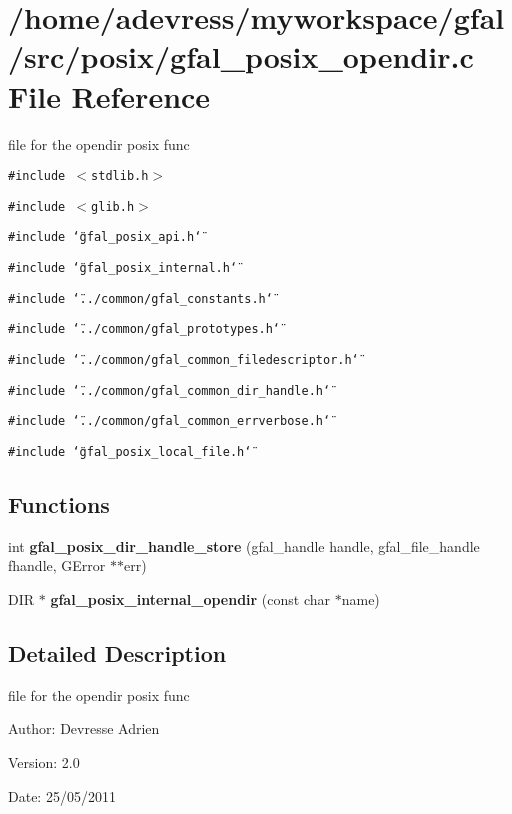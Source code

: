 \section{/home/adevress/myworkspace/gfal/src/posix/gfal\_\-posix\_\-opendir.c File Reference}
\label{gfal__posix__opendir_8c}
file for the opendir posix func 

{\tt \#include $<$stdlib.h$>$}\par
{\tt \#include $<$glib.h$>$}\par
{\tt \#include \char`\"{}gfal\_\-posix\_\-api.h\char`\"{}}\par
{\tt \#include \char`\"{}gfal\_\-posix\_\-internal.h\char`\"{}}\par
{\tt \#include \char`\"{}../common/gfal\_\-constants.h\char`\"{}}\par
{\tt \#include \char`\"{}../common/gfal\_\-prototypes.h\char`\"{}}\par
{\tt \#include \char`\"{}../common/gfal\_\-common\_\-filedescriptor.h\char`\"{}}\par
{\tt \#include \char`\"{}../common/gfal\_\-common\_\-dir\_\-handle.h\char`\"{}}\par
{\tt \#include \char`\"{}../common/gfal\_\-common\_\-errverbose.h\char`\"{}}\par
{\tt \#include \char`\"{}gfal\_\-posix\_\-local\_\-file.h\char`\"{}}\par
\subsection*{Functions}
\begin{CompactItemize}
\item 
int \textbf{gfal\_\-posix\_\-dir\_\-handle\_\-store} (gfal\_\-handle handle, gfal\_\-file\_\-handle fhandle, GError $\ast$$\ast$err)\label{gfal__posix__opendir_8c_ecdb7def5a0cad7ee899dd6c64c85f5d}

\item 
DIR $\ast$ \textbf{gfal\_\-posix\_\-internal\_\-opendir} (const char $\ast$name)\label{gfal__posix__opendir_8c_b2e2608cd7c4ff0cecf68e04923d93cc}

\end{CompactItemize}


\subsection{Detailed Description}
file for the opendir posix func 

\begin{Desc}
\item[Author:]Devresse Adrien \end{Desc}
\begin{Desc}
\item[Version:]2.0 \end{Desc}
\begin{Desc}
\item[Date:]25/05/2011 \end{Desc}
